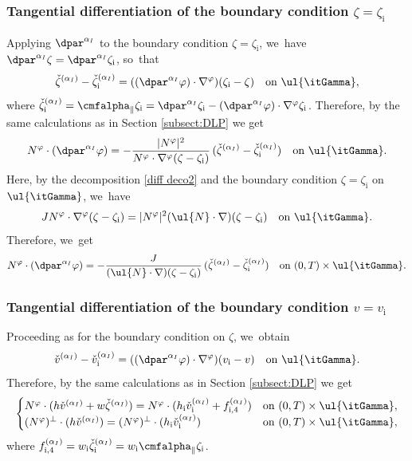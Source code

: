 \subsubsection{Tangential differentiation of the boundary condition $\zeta=\zeta_\mathrm{i}$}
Applying $\dpar^{\alpha_I}$ to the boundary condition $\zeta=\zeta_\mathrm{i}$, we~have $\dpar^{\alpha_I}\zeta=\dpar^{\alpha_I}\zeta_\mathrm{i}$, so~that
\[
\check{\zeta}^{(\alpha_I)}-\check{\zeta}_\mathrm{i}^{(\alpha_I)} = ((\dpar^{\alpha_I}\varphi)\cdot\nabla^\varphi)(\zeta_\mathrm{i}-\zeta)
\quad\mbox{on } \ul{\itGamma},
\]
where $\check{\zeta}_\mathrm{i}^{(\alpha_I)} = \cmfalpha_\parallel \zeta_\mathrm{i}
= \dpar^{\alpha_I}\zeta_\mathrm{i}-(\dpar^{\alpha_I}\varphi)\cdot\nabla^\varphi\zeta_\mathrm{i}$.
Therefore, by the same calculations as in Section \ref{subsect:DLP} we get
\[
N^\varphi\cdot(\dpar^{\alpha_I}\varphi)
= -\frac{|N^\varphi|^2}{N^\varphi\cdot\nabla^\varphi(\zeta-\zeta_\mathrm{i})}\,(\check{\zeta}^{(\alpha_I)}-\check{\zeta}_\mathrm{i}^{(\alpha_I)})\quad\text{on }\ul{\itGamma}.
\]
Here, by the decomposition \eqref{diff deco2} and the boundary condition $\zeta=\zeta_\mathrm{i}$ on $\ul{\itGamma}$, we~have
\[
JN^\varphi\cdot\nabla^\varphi(\zeta-\zeta_\mathrm{i})=|N^\varphi|^2(\ul{N}\cdot\nabla)(\zeta-\zeta_\mathrm{i})\quad\text{on }\ul{\itGamma}.
\]
Therefore, we~get
\begin{equation}\label{EqPhi2}
N^\varphi\cdot(\dpar^{\alpha_I}\varphi)
= - \frac{J}{(\ul{N}\cdot\nabla)(\zeta-\zeta_\mathrm{i})}\,(\check{\zeta}^{(\alpha_I)}-\check{\zeta}_\mathrm{i}^{(\alpha_I)})
\quad\text{on } (0,T)\times\ul{\itGamma}.
\end{equation}

\subsubsection{Tangential differentiation of the boundary condition $v=v_\mathrm{i}$}
Proceeding as for the boundary condition on $\zeta$, we~obtain
\[
\check{v}^{(\alpha_I)}-\check{v}_\mathrm{i}^{(\alpha_I)} = ((\dpar^{\alpha_I}\varphi)\cdot\nabla^\varphi)(v_\mathrm{i}-v)
\quad\mbox{on } \ul{\itGamma}.
\]
Therefore, by the same calculations as in Section \ref{subsect:DLP} we get
\begin{equation}\label{QLBC0}
\begin{cases}
N^\varphi\cdot(h\check{v}^{(\alpha_I)}+w\check{\zeta}^{(\alpha_I)})
= N^\varphi\cdot(h_\mathrm{i}\check{v}_\mathrm{i}^{(\alpha_I)}+f_{{\rm i},4}^{(\alpha_I)}) &\text{on } (0,T)\times\ul{\itGamma}, \\
(N^\varphi)^\perp\cdot(h\check{v}^{(\alpha_I)})=(N^\varphi)^\perp\cdot(h_\mathrm{i}\check{v}_\mathrm{i}^{(\alpha_I)}) &\text{on } (0,T)\times\ul{\itGamma},
\end{cases}
\end{equation}
where $f_{{\rm i},4}^{(\alpha_I)}= w_\mathrm{i} \check{\zeta}_\mathrm{i}^{(\alpha_I)} = w_\mathrm{i} \cmfalpha_\parallel \zeta_\mathrm{i}$.

